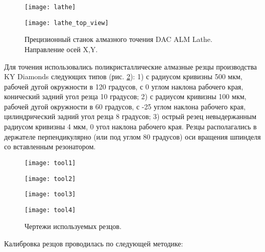 \begin{figure}[ht]
  \begin{minipage}[ht]{0.49\linewidth}\centering
    \texttt{[image: lathe]}
  \end{minipage}
  \hfill
  \begin{minipage}[ht]{0.49\linewidth}\centering
    \texttt{[image: lathe\_top\_view]}
  \end{minipage}
  \caption{Прецизионный станок алмазного точения DAC ALM Lathe. Направление осей X,Y.}
  \label{lathe}
\end{figure}

Для точения использовались поликристаллические алмазные резцы производства KY Diamonds следующих типов (рис. \ref{diamond_tools}): 1) с радиусом кривизны 500 мкм, рабочей дугой окружности в 120 градусов, с 0 углом наклона рабочего края, конический задний угол резца 10 градусов; 2) с радиусом кривизны 100 мкм, рабочей дугой окружности в 60 градусов, с -25 углом наклона рабочего края, цилиндрический задний угол резца 8 градусов; 3) острый резец невыдержанным радиусом кривизны 4 мкм, 0 угол наклона рабочего края. Резцы располагались в держателе перпендикулярно (или под углом 80 градусов) оси вращения шпинделя со вставленным резонатором.

\begin{figure}[ht]
  \begin{minipage}[ht]{0.24\linewidth}\centering
    \texttt{[image: tool1]}
  \end{minipage}
  \hfill
  \begin{minipage}[ht]{0.24\linewidth}\centering
    \texttt{[image: tool2]}
  \end{minipage}
  \hfill
  \begin{minipage}[ht]{0.24\linewidth}\centering
    \texttt{[image: tool3]}
  \end{minipage}
  \hfill
  \begin{minipage}[ht]{0.24\linewidth}\centering
    \texttt{[image: tool4]}
  \end{minipage}
  \caption{Чертежи используемых резцов.}
  \label{diamond_tools}
\end{figure}

Калибровка резцов проводилась по следующей методике:

